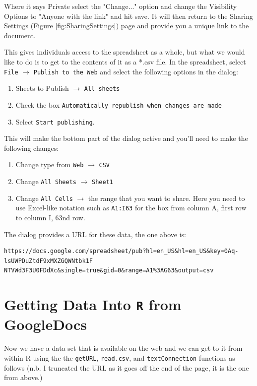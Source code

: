 \documentclass[letterpaper,twoside,openany]{book}
\begin{document}
Where it says Private select the "Change..." option and change the Visibility Options to "Anyone with the link" and hit save.  It will then return to the Sharing Settings (Figure \ref{fig:SharingSettings}) page and provide you a unique link to the document.  

This gives individuals access to the spreadsheet as a whole, but what we would like to do is to get to the contents of it as a *.csv file.  In the spreadsheet, select \texttt{File} $\to$ \texttt{Publish to the Web} and select the following options in the dialog:
\begin{enumerate}
	\item Sheets to Publish $\to$ \texttt{All sheets}
	\item Check the box \texttt{Automatically republish when changes are made}
	\item Select \texttt{Start publishing}.
\end{enumerate}

This will make the bottom part of the dialog active and you'll need to make the following changes:

\begin{enumerate}
	\item Change type from \texttt{Web} $\to$ \texttt{CSV}
	\item Change \texttt{All Sheets} $\to$ \texttt{Sheet1}
	\item Change \texttt{All Cells} $\to$ the range that you want to share.  Here you need to use Excel-like notation such as \texttt{A1:I63} for the box from column A, first row to column I, 63nd row.
\end{enumerate}

The dialog provides a URL for these data, the one above is:

\begin{verbatim}
https://docs.google.com/spreadsheet/pub?hl=en_US&hl=en_US&key=0Aq-lsUWPDuZtdF9xMXZGQWNtbk1F
NTVWd3F3U0FDdXc&single=true&gid=0&range=A1%3AG63&output=csv
\end{verbatim}


\section{Getting Data Into \texttt{R} from GoogleDocs}

Now we have a data set that is available on the web and we can get to it from within R using the the \texttt{getURL}, \texttt{read.csv}, and \texttt{textConnection} functions as follows (n.b. I truncated the URL as it goes off the end of the page, it is the one from above.)
\end{document}
